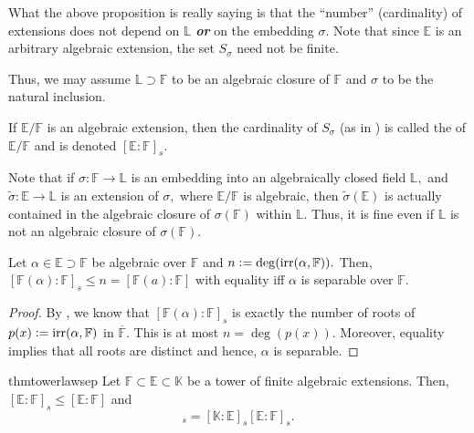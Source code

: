 \begin{rem}
    What the above proposition is really saying is that the ``number'' (cardinality) of extensions does not depend on $\mathbb{L}$ \textbf{\emph{or}} on the embedding $\sigma.$ Note that since $\mathbb{E}$ is an arbitrary algebraic extension, the set $S_\sigma$ need not be finite. 

    Thus, we may assume $\mathbb{L} \supset \mathbb{F}$ to be an algebraic closure of $\mathbb{F}$ and $\sigma$ to be the natural inclusion.
\end{rem}

\begin{defn}%
    If $\mathbb{E}/\mathbb{F}$ is an algebraic extension, then the cardinality of $S_\sigma$ (as in ) is called the  of $\mathbb{E}/\mathbb{F}$ and is denoted $[\mathbb{E} : \mathbb{F}]_s.$
\end{defn}

\begin{rem}
    Note that if $\sigma : \mathbb{F} \to \mathbb{L}$ is an embedding into an algebraically closed field $\mathbb{L},$ and $\widetilde{\sigma} : \mathbb{E} \to \mathbb{L}$ is an extension of $\sigma,$ where $\mathbb{E}/\mathbb{F}$ is algebraic, then $\widetilde{\sigma}(\mathbb{E})$ is actually contained in the algebraic closure of $\sigma(\mathbb{F})$ within $\mathbb{L}.$ Thus, it is fine even if $\mathbb{L}$ is not an algebraic closure of $\sigma(\mathbb{F}).$
\end{rem}

\begin{prop} \label{prop:sepdeglessthannordeg}
    Let $\alpha \in \mathbb{E} \supset \mathbb{F}$ be algebraic over $\mathbb{F}$ and $n \vcentcolon= \deg(\operatorname{irr}(\alpha, \mathbb{F})).$ Then, $[\mathbb{F}(\alpha) : \mathbb{F}]_s \le n = [\mathbb{F}(a) : \mathbb{F}]$ with equality iff $\alpha$ is separable over $\mathbb{F}.$
\end{prop}
\begin{proof} 
    By , we know that $[\mathbb{F}(\alpha) : \mathbb{F}]_s$ is exactly the number of roots of $p(x) \vcentcolon= \operatorname{irr}(\alpha, \mathbb{F})$ in $\overline{\mathbb{F}}.$ This is at most $n = \deg(p(x)).$ Moreover, equality implies that all roots are distinct and hence, $\alpha$ is separable.
\end{proof}

\begin{restatable}{thm}{towerlawsep}
\label{thm:towerlawsep}
    Let $\mathbb{F} \subset \mathbb{E} \subset \mathbb{K}$ be a tower of finite algebraic extensions. Then, $[\mathbb{E} : \mathbb{F}]_s \le [\mathbb{E} : \mathbb{F}]$ and
    \begin{equation*} 
        [\mathbb{K} : \mathbb{F}]_s = [\mathbb{K} : \mathbb{E}]_s [\mathbb{E} : \mathbb{F}]_s.
    \end{equation*} \hfill\hyperref[thm:towerlawsep2]{\downsym}
\end{restatable}

